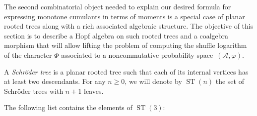 \documentclass[pdftex]{sigma}%
\numberwithin{equation}{section}
\newcommand{\A}{\mathcal{A}}
\newcommand{\ST}{\operatorname{ST}}
\begin{document}
The second combinatorial object needed to explain our desired formula for expressing monotone cumulants in terms of moments is a special case of planar rooted trees along with a rich associated algebraic structure. The objective of this section is to describe a Hopf algebra on such rooted trees and a coalgebra morphism that will allow lifting the problem of computing the shuffle logarithm of the character $\Phi$ associated to a noncommutative probability space~$(\A,\varphi)$.

\begin{Definition}A \textit{Schr\"oder tree} is a planar rooted tree such that each of its internal vertices has at least two descendants. For any $n\geq0$, we will denote by $\ST(n)$ the set of Schr\"oder trees with $n+1$ leaves.
\end{Definition}
\begin{Example}
The following list contains the elements of $\ST(3)$:


\end{Example}
\end{document}
